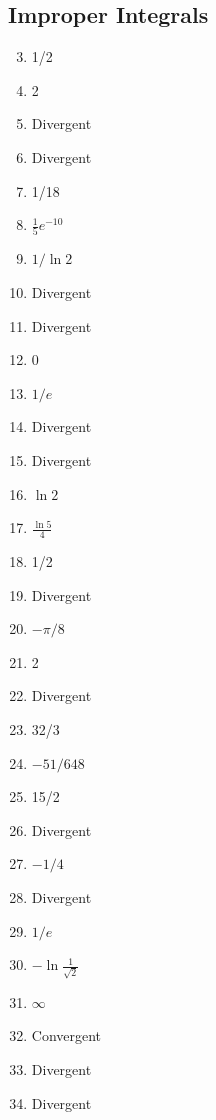 \documentclass{article} \usepackage[margin=1in]{geometry}
\begin{document}
\setcounter{subsection}{7}
\subsection{Improper Integrals}
\begin{enumerate}
	\setcounter{enumi}{2}
	\item 1/2
	      \setcounter{enumi}{4}
	\item 2
	\item Divergent
	\item Divergent
	\item 1/18
	\item $\frac{1}{5}e^{-10}$
	\item $1/\ln2$
	\item Divergent
	\item Divergent
	\item 0
	\item $1/e$
	\item Divergent
	\item Divergent
	\item $\ln2$
	\item $\frac{\ln5}{4}$
	\item 1/2
	      \setcounter{enumi}{20}
	\item Divergent
	      \setcounter{enumi}{22}
	\item $-\pi/8$
	      \setcounter{enumi}{24}
	\item 2
	      \setcounter{enumi}{26}
	\item Divergent
	      \setcounter{enumi}{28}
	\item 32/3
	      \setcounter{enumi}{30}
	\item $-51/648$
	      \setcounter{enumi}{32}
	\item 15/2
	      \setcounter{enumi}{34}
	\item Divergent
	      \setcounter{enumi}{36}
	\item $-1/4$
	      \setcounter{enumi}{38}
	\item Divergent
	      \setcounter{enumi}{40}
	\item $1/e$
	      \setcounter{enumi}{42}
	\item $-\ln\frac{1}{\sqrt2}$
	      \setcounter{enumi}{44}
	\item $\infty$
	      \setcounter{enumi}{48}
	\item Convergent
	      \setcounter{enumi}{50}
	\item Divergent
	      \setcounter{enumi}{52}
	\item Divergent
	      \setcounter{enumi}{54}

\end{enumerate}
\end{document}
